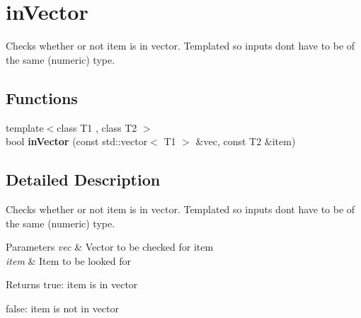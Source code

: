 \hypertarget{group__inVector}{}\section{in\+Vector}
\label{group__inVector}


Checks whether or not item is in vector. Templated so inputs don\textquotesingle{}t have to be of the same (numeric) type.  


\subsection*{Functions}
\begin{DoxyCompactItemize}
\item 
\mbox{\label{group__inVector_gac757458344cbb085dcebd2d0c7b9639f}} 
{\footnotesize template$<$class T1 , class T2 $>$ }\\bool {\bfseries in\+Vector} (const std\+::vector$<$ T1 $>$ \&vec, const T2 \&item)
\end{DoxyCompactItemize}


\subsection{Detailed Description}
Checks whether or not item is in vector. Templated so inputs don\textquotesingle{}t have to be of the same (numeric) type. 


\begin{DoxyParams}{Parameters}
{\em vec} & Vector to be checked for item \\
\hline
{\em item} & Item to be looked for \\
\hline
\end{DoxyParams}
\begin{DoxyReturn}{Returns}
true\+: item is in vector 

false\+: item is not in vector 
\end{DoxyReturn}
